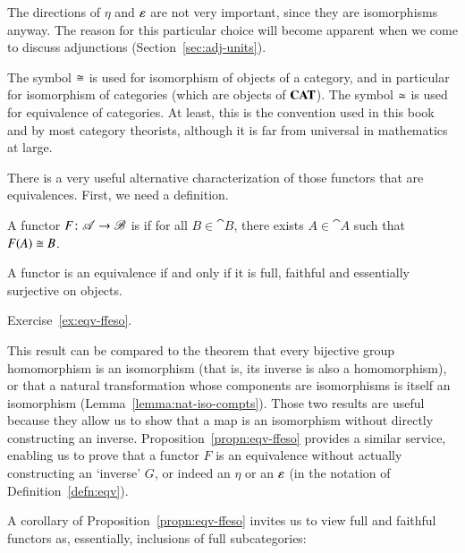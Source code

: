 The directions of $\eta$ and $\varepsilon$ are not very important, since they
are isomorphisms anyway.  The reason for this particular choice will become
apparent when we come to discuss adjunctions (Section~\ref{sec:adj-units}).

\begin{warning}
The symbol $\cong$ is used for isomorphism of objects of a category, and in
particular for isomorphism of categories (which are objects of $\mathbf{CAT}$).
The symbol $\simeq$ is used for equivalence of categories.  At least, this is
the convention used in this book and by most category theorists, although
it is far from universal in mathematics at large.
\end{warning}

There is a very useful alternative characterization of those functors that
are equivalences.  First, we need a definition.

\begin{defn}
A functor $F\from \cat{A} \to \cat{B}$ is  if for all $B \in \cat{B}$, there exists $A \in
\cat{A}$ such that $F(A) \cong B$.
\end{defn}

\begin{propn}
\label{propn:eqv-ffeso}
A functor is an equivalence if and only if it is full, faithful and
essentially surjective on objects.
\end{propn}

\begin{pf}
Exercise~\ref{ex:eqv-ffeso}.
\end{pf}

This result can be compared to the theorem that every bijective group
homomorphism is an isomorphism (that is, its inverse is also a
homomorphism), or that a natural transformation whose components are
isomorphisms is itself an isomorphism (Lemma~\ref{lemma:nat-iso-compts}).
Those two results are useful because they allow us to show that a map is an
isomorphism without directly constructing an inverse.
Proposition~\ref{propn:eqv-ffeso} provides a similar service, enabling us
to prove that a functor $F$ is an equivalence without actually constructing
an `inverse' $G$, or indeed an $\eta$ or an $\varepsilon$ (in the notation of
Definition~\ref{defn:eqv}).

A corollary of Proposition~\ref{propn:eqv-ffeso} invites us to view full
and faithful%
%
%
functors as, essentially, inclusions of full subcategories:

